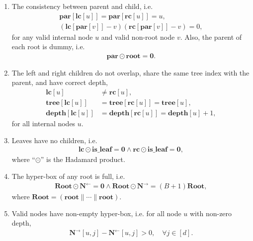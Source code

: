 \begin{enumerate}
  \item The consistency between parent and child, i.e.
  \begin{align}
    \mathbf{par}[\mathbf{lc}[u]]=\mathbf{par}[\mathbf{rc}[u]]=u,\\
    (\mathbf{lc}[\mathbf{par}[v]] - v)(\mathbf{rc}[\mathbf{par}[v]] - v) = 0,
  \end{align}
  for any valid internal node $u$ and valid non-root node $v$.
  Also, the parent of each root is dummy, i.e.
  \begin{align}
    \mathbf{par}\odot \mathbf{root} = \mathbf{0}.
  \end{align}

  \item The left and right children do not overlap, share the same tree index with the parent, and have correct depth,
  \begin{align}
    \mathbf{lc}[u] &\neq \mathbf{rc}[u],\\
  \mathbf{tree}[\mathbf{lc}[u]]&=\mathbf{tree}[\mathbf{rc}[u]]=\mathbf{tree}[u],\\
  \mathbf{depth}[\mathbf{lc}[u]]&=\mathbf{depth}[\mathbf{rc}[u]]=\mathbf{depth}[u]+1,
  \end{align}  
  for all internal nodes $u$.

  \item Leaves have no children, i.e. \begin{align}
    \mathbf{lc}\odot \mathbf{is\_leaf}=\mathbf{0}\land \mathbf{rc}\odot \mathbf{is\_leaf}=\mathbf{0},\label{eq:leaf-no-child}
  \end{align}
  where ``$\odot$'' is the Hadamard product.

  \item The hyper-box of any root is full, i.e.
  \begin{align}
    \mathbf{Root}\odot \mathbf{N}^{\leftarrow}=\mathbf{0}\land \mathbf{Root}\odot \mathbf{N}^{\rightarrow}=(B+1)\mathbf{Root},\label{eq:root-full-box}
  \end{align}
  where $\mathbf{Root} = (\mathbf{root}\|\cdots\|\mathbf{root})$.

  \item Valid nodes have non-empty hyper-box, i.e. for all node $u$ with non-zero depth,
    \begin{align}
    \mathbf{N}^{\rightarrow}[u, j] - \mathbf{N}^{\leftarrow}[u, j] > 0, \quad \forall j\in[d].
    \end{align}


\end{enumerate}
